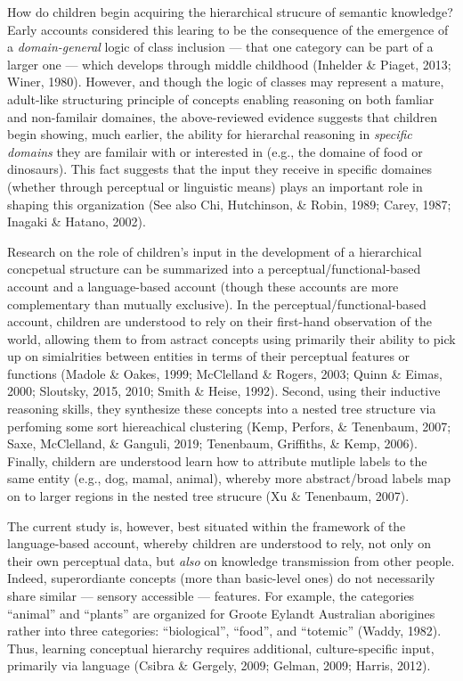 \documentclass[english,,man]{apa6}
\begin{document}
How do children begin acquiring the hierarchical strucure of semantic knowledge? Early accounts considered this learing to be the consequence of the emergence of a \emph{domain-general} logic of class inclusion --- that one category can be part of a larger one --- which develops through middle childhood (Inhelder \& Piaget, 2013; Winer, 1980). However, and though the logic of classes may represent a mature, adult-like structuring principle of concepts enabling reasoning on both famliar and non-familair domaines, the above-reviewed evidence suggests that children begin showing, much earlier, the ability for hierarchal reasoning in \emph{specific domains} they are familair with or interested in (e.g., the domaine of food or dinosaurs). This fact suggests that the input they receive in specific domaines (whether through perceptual or linguistic means) plays an important role in shaping this organization (See also Chi, Hutchinson, \& Robin, 1989; Carey, 1987; Inagaki \& Hatano, 2002).

Research on the role of children's input in the development of a hierarchical concpetual structure can be summarized into a perceptual/functional-based account and a language-based account (though these accounts are more complementary than mutually exclusive). In the perceptual/functional-based account, children are understood to rely on their first-hand observation of the world, allowing them to from astract concepts using primarily their ability to pick up on simialrities between entities in terms of their perceptual features or functions (Madole \& Oakes, 1999; McClelland \& Rogers, 2003; Quinn \& Eimas, 2000; Sloutsky, 2015, 2010; Smith \& Heise, 1992). Second, using their inductive reasoning skills, they synthesize these concepts into a nested tree structure via perfoming some sort hiereachical clustering (Kemp, Perfors, \& Tenenbaum, 2007; Saxe, McClelland, \& Ganguli, 2019; Tenenbaum, Griffiths, \& Kemp, 2006). Finally, childern are understood learn how to attribute mutliple labels to the same entity (e.g., dog, mamal, animal), whereby more abstract/broad labels map on to larger regions in the nested tree strucure (Xu \& Tenenbaum, 2007).

The current study is, however, best situated within the framework of the language-based account, whereby children are understood to rely, not only on their own perceptual data, but \emph{also} on knowledge transmission from other people. Indeed, superordiante concepts (more than basic-level ones) do not necessarily share similar --- sensory accessible --- features. For example, the categories \enquote{animal} and \enquote{plants} are organized for Groote Eylandt Australian aborigines rather into three categories: \enquote{biological}, \enquote{food}, and \enquote{totemic} (Waddy, 1982). Thus, learning conceptual hierarchy requires additional, culture-specific input, primarily via language (Csibra \& Gergely, 2009; Gelman, 2009; Harris, 2012).
\end{document}
